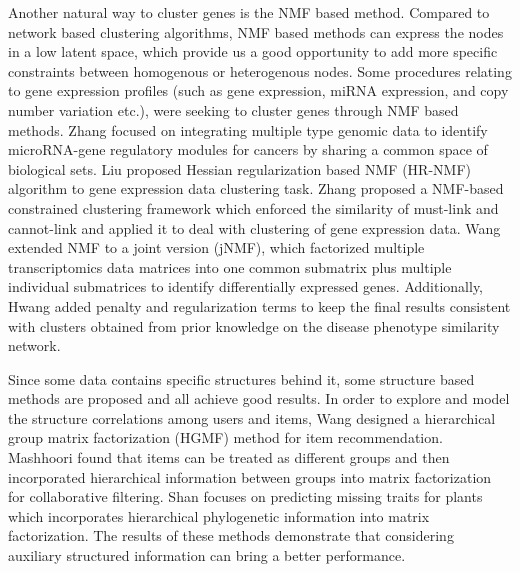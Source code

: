 \documentclass{bmcart}
\begin{document}
Another natural way to cluster genes is the NMF based method. Compared to network based clustering algorithms, NMF based methods can express the nodes in a low latent space, which provide us a good opportunity to add more specific constraints between homogenous or heterogenous nodes. Some procedures relating to gene expression profiles (such as gene expression, miRNA expression, and copy number variation etc.), were seeking to cluster genes through NMF based methods.
Zhang \cite{Zhang2011} focused on integrating multiple type genomic data to identify microRNA-gene regulatory modules for cancers by sharing a common space of biological sets. Liu \cite{XiaoLiu2015} proposed Hessian regularization based NMF (HR-NMF) algorithm to gene expression data  clustering task. Zhang \cite{Zhang2015} proposed a NMF-based constrained clustering framework which enforced the similarity of must-link and cannot-link and applied it to deal with clustering of gene expression data. Wang \cite{Wang2015} extended NMF to a joint version (jNMF), which factorized multiple transcriptomics data matrices into one common submatrix plus multiple individual submatrices to identify differentially expressed genes.
Additionally,
Hwang \cite{Hwang2012} added penalty and regularization terms to keep the final results consistent with clusters obtained from prior knowledge on the disease phenotype similarity network.

Since some data contains specific structures behind it, some structure based methods are proposed and all achieve good results. In order to explore and model the structure correlations among users and items, Wang \cite{Wang2014} designed a hierarchical group matrix factorization (HGMF) method for item recommendation.
Mashhoori \cite{AliMashhoori2012} found that items can be treated as different groups and then incorporated  hierarchical information between groups into matrix factorization for collaborative filtering. Shan \cite{Shan2012} focuses on predicting missing traits for plants which incorporates hierarchical phylogenetic information into matrix factorization. The results of these methods demonstrate that considering auxiliary structured information can bring a better performance.
\end{document}
